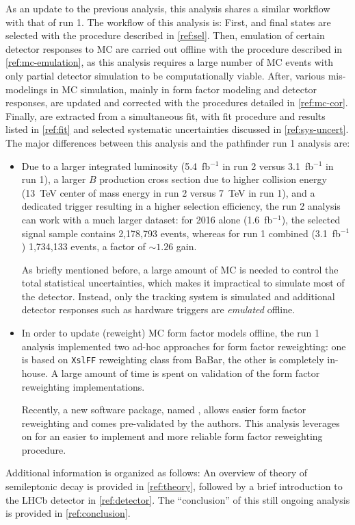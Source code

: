 As an update to the previous analysis, this analysis shares a similar
workflow with that of run 1.
The workflow of this analysis is:
First, \Dstarp\mun and \Dz\mun final states are selected with the procedure
described in \cref{ref:sel}.
Then, emulation of certain detector responses to MC are carried out offline
with the procedure described in
\cref{ref:mc-emulation},
as this analysis requires a large number of MC events with only partial detector
simulation to be computationally viable.
After, various mis-modelings in MC simulation,
mainly in form factor modeling and detector responses, are updated and
corrected with the procedures detailed in \cref{ref:mc-cor}.
Finally, \RDX are extracted from a simultaneous fit, with fit procedure and
results listed in \cref{ref:fit}
and selected systematic uncertainties discussed in
\cref{ref:sys-uncert}.
The major differences between this analysis and the pathfinder run 1 \RDX
analysis are:
\begin{itemize}
    \item Due to a larger integrated luminosity
        (5.4~fb$^{-1}$ in run 2 versus 3.1~fb$^{-1}$ in run 1),
        a larger $B$ production cross section due to higher collision energy
        (13~TeV center of mass energy in run 2 versus 7~TeV in run 1),
        and a dedicated trigger resulting in a higher selection efficiency,
        the run 2 analysis can work with a much larger dataset:
        for 2016 alone (1.6~fb$^{-1}$),
        the selected \Dz\mun signal sample contains 2,178,793 events,
        whereas for run 1 combined (3.1~fb$^{-1}$) 1,734,133 events,
        a factor of $\sim\!1.26$ gain.

        As briefly mentioned before,
        a large amount of MC is needed to control the total statistical
        uncertainties,
        which makes it impractical to simulate most of the detector.
        Instead, only the tracking system is simulated and additional detector
        responses such as hardware triggers are \emph{emulated} offline.

    \item In order to update (reweight) MC form factor models offline,
        the run 1 analysis implemented two ad-hoc approaches for form factor
        reweighting:
        one is based on \texttt{XslFF} reweighting class from BaBar,
        the other is completely in-house.
        A large amount of time is spent on validation of the form factor
        reweighting implementations.

        Recently, a new software package, named \Hammer, allows easier form
        factor reweighting and comes pre-validated by the \Hammer authors.
        This analysis leverages on \Hammer for an easier to implement and more
        reliable form factor reweighting procedure.
\end{itemize}

Additional information is organized as follows:
An overview of theory of semileptonic \B decay is provided in
\cref{ref:theory},
followed by a brief introduction to the LHCb detector in \cref{ref:detector}.
The ``conclusion'' of this still ongoing analysis is provided in
\cref{ref:conclusion}.

